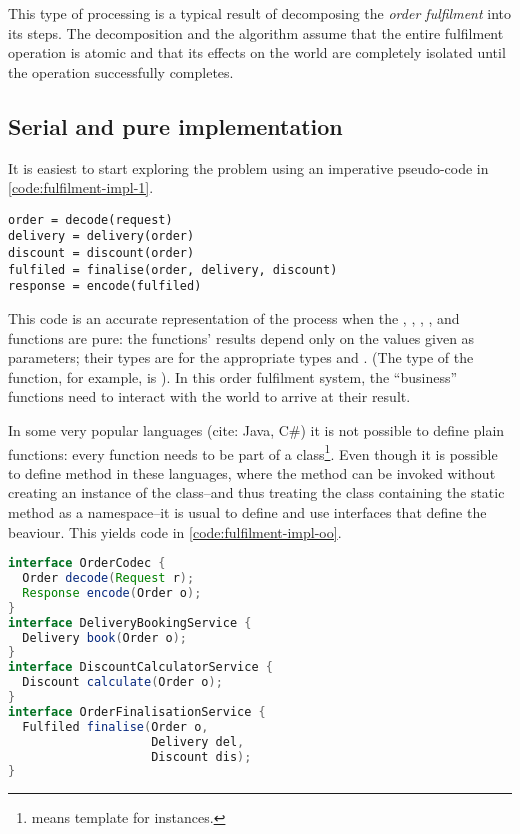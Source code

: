 This type of processing is a typical result of decomposing the \emph{order fulfilment} into its steps. The decomposition and the algorithm assume that the entire fulfilment operation is atomic and that its effects on the world are completely isolated until the  operation successfully completes. 

\subsection{Serial and pure implementation}
It is easiest to start exploring the problem using an imperative pseudo-code in \autoref{code:fulfilment-impl-1}.

\begin{lstlisting}[caption={Fulfilment implementation I}, label={code:fulfilment-impl-1}, language=Pseudo, escapechar=|]
order = decode(request)
delivery = delivery(order)
discount = discount(order)
fulfiled = finalise(order, delivery, discount)
response = encode(fulfiled)
\end{lstlisting}

This code is an accurate representation of the process when the , , , , and  functions are pure: the functions' results depend only on the values given as parameters; their types are  for the appropriate types  and . (The type of the  function, for example, is ). In this order fulfilment system, the ``business'' functions need to interact with the world to arrive at their result. 

In some very popular languages (cite: Java, C\#) it is not possible to define plain functions: every function needs to be part of a class\footnote{ means template for instances.}. Even though it is possible to define  method in these languages, where the method can be invoked without creating an instance of the class--and thus treating the class containing the static method as a namespace--it is usual to define and use interfaces that define the beaviour\cite{prospring}. This yields code in \autoref{code:fulfilment-impl-oo}.

\begin{lstlisting}[caption={Fulfilment OO implementation I}, label={code:fulfilment-impl-oo}, language=Java, escapechar=|]
interface OrderCodec {
  Order decode(Request r);
  Response encode(Order o);
}
interface DeliveryBookingService {
  Delivery book(Order o);
}
interface DiscountCalculatorService {
  Discount calculate(Order o);
}
interface OrderFinalisationService {
  Fulfiled finalise(Order o, 
                    Delivery del, 
                    Discount dis);
}
\end{lstlisting}

